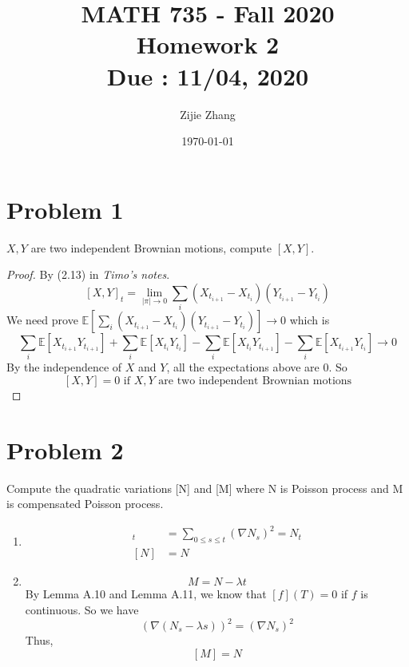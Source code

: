 \documentclass{article}
\title{MATH 735 - Fall 2020\\
		{\Large \textbf{Homework 2}}\\
		{\normalsize \textbf{Due : 11/04, 2020}}
	}
\author{Zijie Zhang}
\date{\today}
\begin{document}
	\maketitle

	\section*{Problem 1}
	$X,Y$ are two independent Brownian motions, compute $[X,Y]$.
	\begin{proof}
		By (2.13) in \textit{Timo’s notes}.
		$$[X,Y]_t = \lim_{|\pi|\to 0}\sum_i(X_{t_{i+1}} - X_{t_{i}})(Y_{t_{i+1}}-Y_{t_{i}})$$
		We need prove $\mathbb{E}\left[\sum_{i}(X_{t_{i+1}} - X_{t_{i}})(Y_{t_{i+1}}-Y_{t_{i}})\right] \to 0$
		which is 
		$$\sum_i \mathbb{E}\left[X_{t_{i+1}}Y_{t_{i+1}}\right] 
		+ \sum_i \mathbb{E}\left[X_{t_{i}}Y_{t_{i}}\right]
		- \sum_i \mathbb{E}\left[X_{t_{i}}Y_{t_{i+1}}\right]
		- \sum_i \mathbb{E}\left[X_{t_{i+1}}Y_{t_{i}}\right] \to 0$$
		By the independence of $X$ and $Y$, all the expectations above are 0.
		So $$[X, Y] = 0 \text{ if } X ,Y \text{ are two independent Brownian motions}$$
	\end{proof}

	\section*{Problem 2}
	Compute the quadratic variations [N] and [M] where N is Poisson process and M is compensated Poisson process.
	\begin{enumerate}
		\item \begin{align*}
			[N]_t &= \sum_{0 \leqslant s \leqslant t}\left(\nabla N_s\right)^2 = N_t\\
			[N] &= N
		\end{align*}
		\item $$M = N - \lambda t$$
		By Lemma A.10 and Lemma A.11, we know that $[f](T) = 0$ if $f$ is continuous. So we have
		$$(\nabla(N_s - \lambda s))^2 = (\nabla N_s)^2$$
		Thus, $$[M] = N$$
	\end{enumerate}

\end{document}
